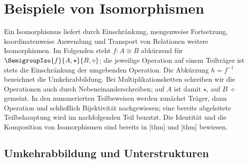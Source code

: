 \section{Beispiele von Isomorphismen}

Ein Isomorphismus liefert durch Einschränkung, mengenweise Fortsetzung,
koordinatenweise Anwendung und Transport von Relationen weitere
Isomorphismen. Im Folgenden steht \(f:A\cong B\) abkürzend für
\(\SemigroupIso{f}{A,\star}{B,\diamond}\); die jeweilige Operation
auf einem Teilträger ist stets die Einschränkung der umgebenden Operation.
Die Abkürzung \(h=f^{-1}\) bezeichnet die Umkehrabbildung.
Bei Multiplikationsketten schreiben wir die Operationen auch durch
Nebeneinanderschreiben; auf \(A\) ist damit \(\star\), auf \(B\)
\(\diamond\) gemeint. In den nummerierten Teilbeweisen werden zunächst
Träger, dann Operation und schließlich Bijektivität nachgewiesen;
eine bereits abgeleitete Teilbehauptung wird im nachfolgenden Teil benutzt.
Die Identität und die Komposition von Isomorphismen sind bereits in
[thm] und
[thm] bewiesen.

\subsection{Umkehrabbildung und Unterstrukturen}


